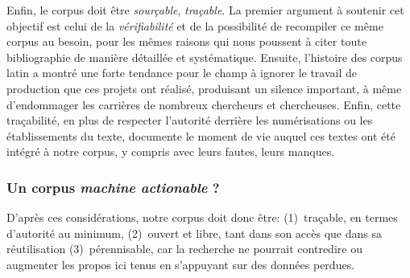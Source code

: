 Enfin, le corpus doit être \textit{sourçable}, \textit{traçable}. La premier argument à soutenir cet objectif est celui de la \textit{vérifiabilité} et de la possibilité de recompiler ce même corpus au besoin, pour les mêmes raisons qui nous poussent à citer toute bibliographie de manière détaillée et systématique. Ensuite, l'histoire des corpus latin a montré une forte tendance pour le champ à ignorer le travail de production que ces projets ont réalisé, produisant un silence important, à même d'endommager les carrières de nombreux chercheurs et chercheuses. Enfin, cette traçabilité, en plus de respecter l'autorité derrière les numérisations ou les établissements du texte, documente le moment de vie auquel ces textes ont été intégré à notre corpus, y compris avec leurs fautes, leurs manques.

\subsubsection{Un corpus \textit{machine actionable} ?}
\label{chap1:method-annotation}

D'après ces considérations, notre corpus doit donc être: (1)~traçable, en termes d'autorité au minimum, (2)~ouvert et libre, tant dans son accès que dans sa réutilisation (3)~pérennisable, car la recherche ne pourrait contredire ou augmenter les propos ici tenus en s'appuyant sur des données perdues.

